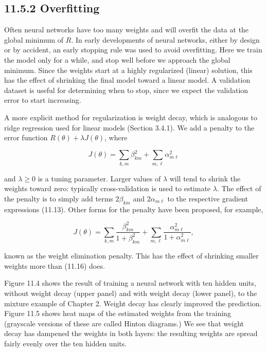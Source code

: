 \documentclass[10pt]{article}
\begin{document}
\subsection*{11.5.2 Overfitting}
Often neural networks have too many weights and will overfit the data at the global minimum of $R$. In early developments of neural networks, either by design or by accident, an early stopping rule was used to avoid overfitting. Here we train the model only for a while, and stop well before we approach the global minimum. Since the weights start at a highly regularized (linear) solution, this has the effect of shrinking the final model toward a linear model. A validation dataset is useful for determining when to stop, since we expect the validation error to start increasing.

A more explicit method for regularization is weight decay, which is analogous to ridge regression used for linear models (Section 3.4.1). We add a penalty to the error function $R(\theta)+\lambda J(\theta)$, where


\begin{equation*}
J(\theta)=\sum_{k, m} \beta_{k m}^{2}+\sum_{m, \ell} \alpha_{m \ell}^{2} \tag{11.16}
\end{equation*}


and $\lambda \geq 0$ is a tuning parameter. Larger values of $\lambda$ will tend to shrink the weights toward zero: typically cross-validation is used to estimate $\lambda$. The effect of the penalty is to simply add terms $2 \beta_{k m}$ and $2 \alpha_{m \ell}$ to the respective gradient expressions (11.13). Other forms for the penalty have been proposed, for example,


\begin{equation*}
J(\theta)=\sum_{k, m} \frac{\beta_{k m}^{2}}{1+\beta_{k m}^{2}}+\sum_{m, \ell} \frac{\alpha_{m \ell}^{2}}{1+\alpha_{m \ell}^{2}}, \tag{11.17}
\end{equation*}


known as the weight elimination penalty. This has the effect of shrinking smaller weights more than (11.16) does.

Figure 11.4 shows the result of training a neural network with ten hidden units, without weight decay (upper panel) and with weight decay (lower panel), to the mixture example of Chapter 2. Weight decay has clearly improved the prediction. Figure 11.5 shows heat maps of the estimated weights from the training (grayscale versions of these are called Hinton diagrams.) We see that weight decay has dampened the weights in both layers: the resulting weights are spread fairly evenly over the ten hidden units.
\end{document}
